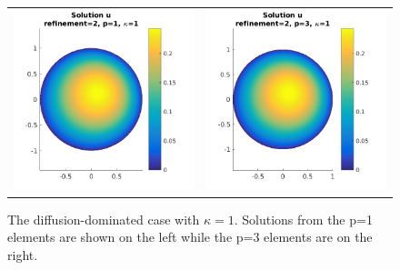 \documentclass{article}
\begin{document}
\begin{figure}[!ht]
\begin{tabular}{c c}
\includegraphics[scale=0.7]{umu_131.png} & 
\includegraphics[scale=0.7]{umu_231.png}
\end{tabular}
\caption{The diffusion-dominated case with $\kappa = 1$. Solutions from the p=1 elements are shown on the left while the p=3 elements are on the right.}
\label{fig:u100}
\end{figure}
\end{document}
